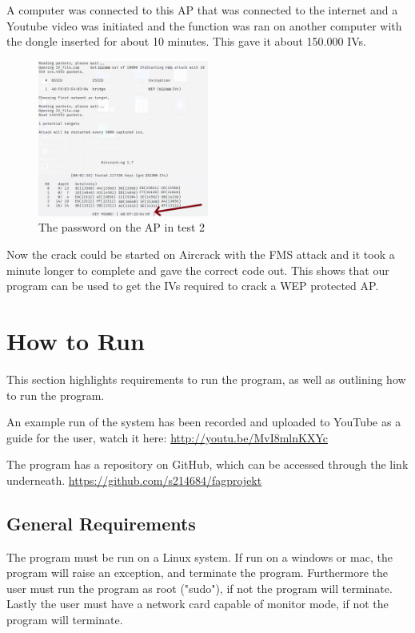A computer was connected to this AP that was connected to the internet and a Youtube video was initiated and the function was ran on another computer with the dongle inserted for about 10 minutes. This gave it about 150.000 IVs.

\begin{figure}[!htbp]
    \centering
    \includegraphics[width=0.5\textwidth]{Latex-Files/Billeder/Tests/WEP2.png}
    \caption{The password on the AP in test 2}
    \label{Crack4}
\end{figure}

Now the crack could be started on Aircrack with the FMS attack and it took a minute longer to complete and gave the correct code out. This shows that our program can be used to get the IVs required to crack a WEP protected AP.

\section{How to Run}
This section highlights requirements to run the program, as well as outlining how to run the program. 

An example run of the system has been recorded and uploaded to YouTube as a guide for the user, watch it here:
\url{http://youtu.be/MvI8mlnKXYc}

The program has a repository on GitHub, which can be accessed through the link underneath.
\url{https://github.com/s214684/fagprojekt}
\subsection{General Requirements}
The program must be run on a Linux system. If run on a windows or mac, the program will raise an exception, and terminate the program. Furthermore the user must run the program as root ("sudo"), if not the program will terminate.
Lastly the user must have a network card capable of monitor mode, if not the program will terminate.
